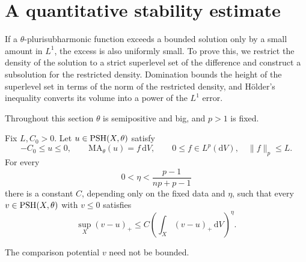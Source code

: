 \section{A quantitative stability estimate}
\label{sec:bounded-stability}

If a $\theta$-plurisubharmonic function exceeds a bounded solution only by a small amount in $L^1$, the excess is also uniformly small. To prove this, we restrict the density of the solution to a strict superlevel set of the difference and construct a subsolution for the restricted density. Domination bounds the height of the superlevel set in terms of the norm of the restricted density, and H\"older's inequality converts its volume into a power of the $L^1$ error.

Throughout this section $\theta$ is semipositive and big, and $p>1$ is fixed.

\begin{theorem}\label{thm:bounded-one-sided-stability}
Fix $L,C_0>0$. Let $u\in\mathrm{PSH}(X,\theta)$ satisfy
\[
 -C_0\leq u\leq0,\qquad
 \mathrm{MA}_\theta(u)=f\,\mathrm{d}V,\qquad
 0\leq f\in L^p(\mathrm{d}V),\quad\|f\|_p\leq L.
\]
For every
\[
 0<\eta<\frac{p-1}{np+p-1}
\]
there is a constant $C$, depending only on the fixed data and $\eta$, such that every $v\in\mathrm{PSH}(X,\theta)$ with $v\leq0$ satisfies
\[
 \sup_X(v-u)_+
       \leq C\left(\int_X(v-u)_+\,\mathrm{d}V\right)^\eta.
\]
\end{theorem}

The comparison potential $v$ need not be bounded.


